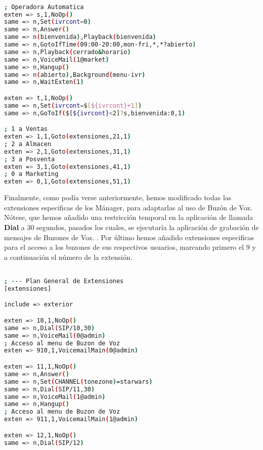 
\begin{lstlisting}[language=bash,title={/etc/asterisk/extensions.conf}]

; Operadora Automatica
exten => s,1,NoOp()
same => n,Set(ivrcont=0)
same => n,Answer()
same => n(bienvenida),Playback(bienvenida)
same => n,GotoIfTime(09:00-20:00,mon-fri,*,*?abierto)
same => n,Playback(cerrado&horario)
same => n,VoiceMail(1@market)
same => n,Hangup()
same => n(abierto),Background(menu-ivr)
same => n,WaitExten(1)

exten => t,1,NoOp()
same => n,Set(ivrcont=$[${ivrcont}+1])
same => n,GoToIf($[${ivrcont}<2]?s,bienvenida:0,1)

; 1 a Ventas
exten => 1,1,Goto(extensiones,21,1)
; 2 a Almacen
exten => 2,1,Goto(extensiones,31,1)
; 3 a Posventa
exten => 3,1,Goto(extensiones,41,1)
; 0 a Marketing
exten => 0,1,Goto(extensiones,51,1)

\end{lstlisting}

Finalmente, como podía verse anteriormente, hemos modificado todas las extensiones especificas de los Mánager, para adaptarlas al uso de Buzón de Voz. Nótese, que hemos añadido una restricción temporal en la aplicación de llamada \textbf{Dial} a 30 segundos, pasados los cuales, se ejecutaría la aplicación de grabación de mensajes de Buzones de Voz. . Por último hemos añadido extensiones especificas para el acceso a los buzones de sus respectivos usuarios, marcando primero el 9 y a continuación el número de la extensión.

\begin{lstlisting}[language=bash,title={/etc/asterisk/extensions.conf}]

; --- Plan General de Extensiones
[extensiones]

include => exterior

exten => 10,1,NoOp()
same => n,Dial(SIP/10,30)
same => n,VoiceMail(0@admin)
; Acceso al menu de Buzon de Voz
exten => 910,1,VoicemailMain(0@admin)

exten => 11,1,NoOp()
same => n,Answer()
same => n,Set(CHANNEL(tonezone)=starwars)
same => n,Dial(SIP/11,30)
same => n,VoiceMail(1@admin)
same => n,Hangup()
; Acceso al menu de Buzon de Voz
exten => 911,1,VoicemailMain(1@admin)

exten => 12,1,NoOp()
same => n,Dial(SIP/12)

\end{lstlisting}

